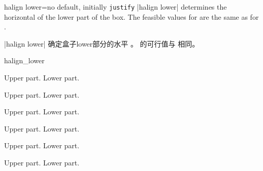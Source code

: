 \begin{docTcbKey}[][doc new=2015-05-07]{halign lower}{=}{no default, initially \texttt{justify}}
|halign lower| determines the horizontal  of the lower part of the box.
The feasible values for  are the same as for .


|halign lower| 确定盒子lower部分的水平 。  的可行值与  相同。
\begin{exdispExample}{halign_lower}
\begin{tcbraster}[raster columns=3,fonttitle=\bfseries,
colback=red!5!white,colframe=red!75!black]

\begin{tcolorbox}[adjusted title=flush center,halign lower=flush center]
Upper part. \tcblower Lower part.
\end{tcolorbox}
\begin{tcolorbox}[adjusted title=flush left,halign lower=flush left]
Upper part. \tcblower Lower part.
\end{tcolorbox}
\begin{tcolorbox}[adjusted title=flush right,halign lower=flush right]
Upper part. \tcblower Lower part.
\end{tcolorbox}
\begin{tcolorbox}[adjusted title=center,halign lower=center]
Upper part. \tcblower Lower part.
\end{tcolorbox}
\begin{tcolorbox}[adjusted title=left,halign lower=left]
Upper part. \tcblower Lower part.
\end{tcolorbox}
\begin{tcolorbox}[adjusted title=right,halign lower=right]
Upper part. \tcblower Lower part.
\end{tcolorbox}

\end{tcbraster}
\end{exdispExample}
\end{docTcbKey}






